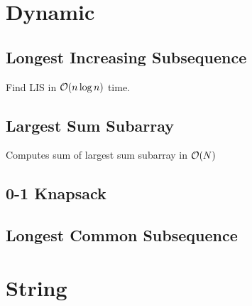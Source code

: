 \documentclass[landscape,8pt]{article}
\begin{document}
\begin{multicols}{2}
\columnbreak

\section{Dynamic}
  \subsection{Longest Increasing Subsequence}
    Find LIS in $\order{n \log n}$ time.
      

  \subsection{Largest Sum Subarray}
    Computes sum of largest sum subarray in $\order{N}$
      

  \subsection{0-1 Knapsack}
    
  \subsection{Longest Common Subsequence}
    





\section{String}

\end{multicols}
\end{document}
